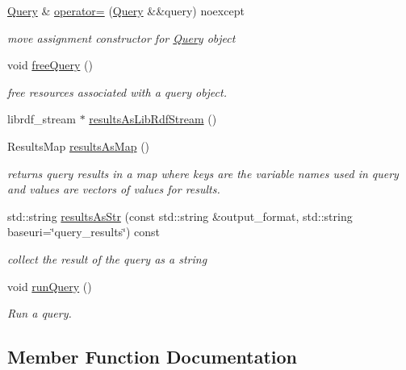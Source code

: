 \begin{DoxyCompactItemize}
\item 
\mbox{\label{classomexmeta_1_1Query_a818772558b490e25b2ee1bc2417e1282}} 
\hyperlink{classomexmeta_1_1Query}{Query} \& \hyperlink{classomexmeta_1_1Query_a818772558b490e25b2ee1bc2417e1282}{operator=} (\hyperlink{classomexmeta_1_1Query}{Query} \&\&query) noexcept
\begin{DoxyCompactList}\small\item\em move assignment constructor for \hyperlink{classomexmeta_1_1Query}{Query} object \end{DoxyCompactList}\item 
void \hyperlink{classomexmeta_1_1Query_a0b9e4ef7fb6c3d0e79a51ed327639ac0}{free\+Query} ()
\begin{DoxyCompactList}\small\item\em free resources associated with a query object. \end{DoxyCompactList}\item 
librdf\+\_\+stream $\ast$ \hyperlink{classomexmeta_1_1Query_a0dda4502056d712d351f7057329c7688}{results\+As\+Lib\+Rdf\+Stream} ()
\item 
Results\+Map \hyperlink{classomexmeta_1_1Query_ab50cc5f76dcf7f863f9fa9d0bf755071}{results\+As\+Map} ()
\begin{DoxyCompactList}\small\item\em returns query results in a map where keys are the variable names used in query and values are vectors of values for results. \end{DoxyCompactList}\item 
std\+::string \hyperlink{classomexmeta_1_1Query_a7109dd08bd808bf5a20becb164622ed6}{results\+As\+Str} (const std\+::string \&output\+\_\+format, std\+::string baseuri=\char`\"{}query\+\_\+results\char`\"{}) const
\begin{DoxyCompactList}\small\item\em collect the result of the query as a string \end{DoxyCompactList}\item 
void \hyperlink{classomexmeta_1_1Query_a879a4db0413abc8f4a3470877ebf5193}{run\+Query} ()
\begin{DoxyCompactList}\small\item\em Run a query. \end{DoxyCompactList}\end{DoxyCompactItemize}


\subsection{Member Function Documentation}
\mbox{\label{classomexmeta_1_1Query_a0b9e4ef7fb6c3d0e79a51ed327639ac0}} 
